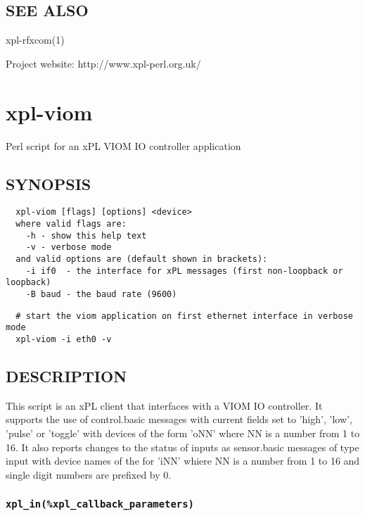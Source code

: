 \subsection*{SEE ALSO\label{xpl-tty-tcp_SEE_ALSO}}


xpl-rfxcom(1)



Project website: http://www.xpl-perl.org.uk/

\section{xpl-viom\label{xpl-viom}}


Perl script for an xPL VIOM IO controller application

\subsection*{SYNOPSIS\label{xpl-viom_SYNOPSIS}}
\begin{verbatim}
  xpl-viom [flags] [options] <device>
  where valid flags are:
    -h - show this help text
    -v - verbose mode
  and valid options are (default shown in brackets):
    -i if0  - the interface for xPL messages (first non-loopback or loopback)
    -B baud - the baud rate (9600)
\end{verbatim}
\begin{verbatim}
  # start the viom application on first ethernet interface in verbose mode
  xpl-viom -i eth0 -v
\end{verbatim}
\subsection*{DESCRIPTION\label{xpl-viom_DESCRIPTION}}


This script is an xPL client that interfaces with a VIOM IO
controller.  It supports the use of control.basic messages with
current fields set to 'high', 'low', 'pulse' or 'toggle' with devices
of the form 'oNN' where NN is a number from 1 to 16.  It also reports
changes to the status of inputs as sensor.basic messages of type input
with device names of the for 'iNN' whiere NN is a number from 1 to 16
and single digit numbers are prefixed by 0.

\subsubsection*{\texttt{xpl\_in(\%xpl\_callback\_parameters)}\label{xpl-viom_xpl_in_xpl_callback_parameters_}}


